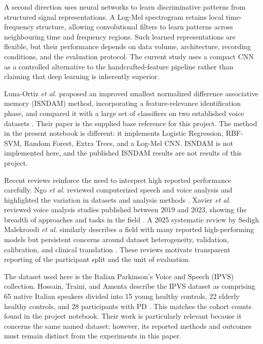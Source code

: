 \documentclass[conference]{IEEEtran}
\begin{document}
A second direction uses neural networks to learn discriminative patterns from structured signal representations. A Log-Mel spectrogram retains local time-frequency structure, allowing convolutional filters to learn patterns across neighbouring time and frequency regions. Such learned representations are flexible, but their performance depends on data volume, architecture, recording conditions, and the evaluation protocol. The current study uses a compact CNN as a controlled alternative to the handcrafted-feature pipeline rather than claiming that deep learning is inherently superior.

Luna-Ortiz \emph{et al.} proposed an improved smallest normalized difference associative memory (ISNDAM) method, incorporating a feature-relevance identification phase, and compared it with a large set of classifiers on two established voice datasets \cite{luna2023}. Their paper is the supplied base reference for this project. The method in the present notebook is different: it implements Logistic Regression, RBF-SVM, Random Forest, Extra Trees, and a Log-Mel CNN. ISNDAM is not implemented here, and the published ISNDAM results are not results of this project.

Recent reviews reinforce the need to interpret high reported performance carefully. Ngo \emph{et al.} reviewed computerized speech and voice analysis and highlighted the variation in datasets and analysis methods \cite{ngo2022}. Xavier \emph{et al.} reviewed voice analysis studies published between 2019 and 2023, showing the breadth of approaches and tasks in the field \cite{xavier2025}. A 2025 systematic review by Sedigh Malekroodi \emph{et al.} similarly describes a field with many reported high-performing models but persistent concerns around dataset heterogeneity, validation, calibration, and clinical translation \cite{malekroodi2025}. These reviews motivate transparent reporting of the participant split and the unit of evaluation.

The dataset used here is the Italian Parkinson's Voice and Speech (IPVS) collection. Hossain, Traini, and Amenta describe the IPVS dataset as comprising 65 native Italian speakers divided into 15 young healthy controls, 22 elderly healthy controls, and 28 participants with PD \cite{hossain2026}. This matches the cohort counts found in the project notebook. Their work is particularly relevant because it concerns the same named dataset; however, its reported methods and outcomes must remain distinct from the experiments in this paper.
\end{document}
